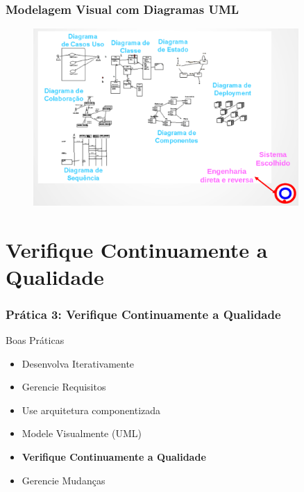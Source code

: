 \begin{frame}
 \frametitle{Modelagem Visual com Diagramas UML}
 
  \begin{figure}
   \centering
   \includegraphics[width = 0.9\textwidth]{figs/fig13.png}
  \end{figure}
\end{frame}

\section{ Verifique Continuamente a Qualidade}
\begin{frame}
 \frametitle{Prática 3:  Verifique Continuamente a Qualidade}
 \begin{block}{Boas Práticas}
 \begin{itemize}
  \item Desenvolva Iterativamente
  \item Gerencie Requisitos
  \item Use arquitetura componentizada
  \item  Modele Visualmente (UML)	
  \item  \textbf{Verifique Continuamente a Qualidade}
  \item Gerencie Mudanças  
 \end{itemize}
\end{block}
\end{frame}


